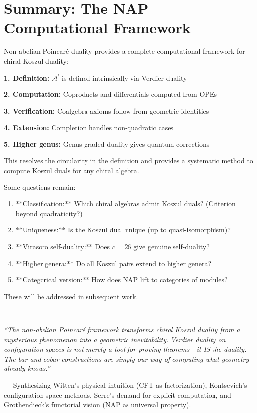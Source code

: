 \section{Summary: The NAP Computational Framework}

\begin{principle}\label{prin:NAP-computational}
Non-abelian Poincaré duality provides a complete computational framework for chiral Koszul duality:

\textbf{1. Definition:} $\mathcal{A}^!$ is defined intrinsically via Verdier duality

\textbf{2. Computation:} Coproducts and differentials computed from OPEs

\textbf{3. Verification:} Coalgebra axioms follow from geometric identities

\textbf{4. Extension:} Completion handles non-quadratic cases

\textbf{5. Higher genus:} Genus-graded duality gives quantum corrections

This resolves the circularity in the definition and provides a systematic method to compute Koszul duals for any chiral algebra.
\end{principle}

\begin{remark}\label{rem:outstanding-NAP}
Some questions remain:
\begin{enumerate}
\item **Classification:** Which chiral algebras admit Koszul duals? (Criterion beyond quadraticity?)
\item **Uniqueness:** Is the Koszul dual unique (up to quasi-isomorphism)?
\item **Virasoro self-duality:** Does $c=26$ give genuine self-duality?
\item **Higher genera:** Do all Koszul pairs extend to higher genera?
\item **Categorical version:** How does NAP lift to categories of modules?
\end{enumerate}

These will be addressed in subsequent work.
\end{remark}

---

\begin{center}
\textit{``The non-abelian Poincaré framework transforms chiral Koszul duality from a mysterious phenomenon into a geometric inevitability. Verdier duality on configuration spaces is not merely a tool for proving theorems—it IS the duality. The bar and cobar constructions are simply our way of computing what geometry already knows.''}

--- Synthesizing Witten's physical intuition (CFT as factorization), Kontsevich's configuration space methods, Serre's demand for explicit computation, and Grothendieck's functorial vision (NAP as universal property).
\end{center}